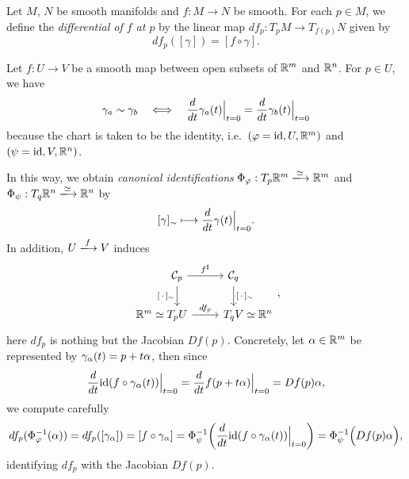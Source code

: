\begin{definition}
  Let \(M\), \(N\) be smooth manifolds and \(f:M\to N\) be smooth. For each \(p\in M\), we define the \emph{differential of \(f\) at \(p\)} by the linear map \(df_p:T_pM\to T_{f(p)}N\) given by \[
    df_p([\gamma]) = [f\circ\gamma].
  \]
\end{definition}

\begin{example}
  Let \(f:U\longrightarrow V\) be a smooth map between open subsets of \(\mathbb{R}^m\) and \(\mathbb{R}^n\). For \(p\in U\), we have \[
    \gamma_a \sim \gamma_b
    \quad\Longleftrightarrow\quad
    \frac{d}{dt} \gamma_a(t)\Big|_{t=0} = \frac{d}{dt} \gamma_b(t)\Big|_{t=0}
  \] because the chart is taken to be the identity, i.e.\ \((\varphi = \mathrm{id},U,\mathbb{R}^m)\) and \((\psi = \mathrm{id},V,\mathbb{R}^n)\).
  \begin{roof}
    In this way, we obtain \emph{canonical identifications} \(\Phi_\f:T_p\R^m \xlongrightarrow{\simeq} \R^m\) and \(\Phi_\psi:T_q\R^n \xlongrightarrow{\simeq} \R^n\) by \[
    [\gamma]_\sim \longmapsto \frac{d}{dt}\gamma(t)\Big|_{t=0}.
  \]
    In addition, \(U\xlongrightarrow{f}V\) induces \[
      \begin{tikzcd}
        & \cal{C}_p \ar[']{d}{[\,\cdot\,]_\sim} \ar{r}{f^\sharp} & \cal{C}_q \ar{d}{[\,\cdot\,]_\sim} & \\
        \R^m \simeq \hspace{-3em} & T_pU \ar{r}{df_p} & T_qV & \hspace{-3em} \simeq \R^n
      \end{tikzcd},
    \] here \(df_p\) is nothing but the Jacobian \(D f(p)\). Concretely, let \(\alpha\in\mathbb{R}^m\) be represented by \(\gamma_\alpha(t) = p + t\alpha\), then since \[
      \frac{d}{dt} \mathrm{id}(f\circ\gamma_\alpha(t))\Big|_{t=0}
      = \frac{d}{dt} f(p + t\alpha)\Big|_{t=0}
      = Df(p)\alpha,
    \] we compute carefully \begin{align*}
      df_p(\Phi_\varphi^{-1}(\alpha))
      = df_p([\gamma_\alpha])
      = [f\circ\gamma_\alpha]
      = \Phi_\psi^{-1}\bigg(\frac{d}{dt} \mathrm{id}(f\circ\gamma_\alpha(t))\Big|_{t=0}\bigg)
      = \Phi_\psi^{-1}\Big(Df(p)\alpha\Big),
    \end{align*}
    identifying \(df_p\) with the Jacobian \(Df(p)\).
  \end{roof}
\end{example}

